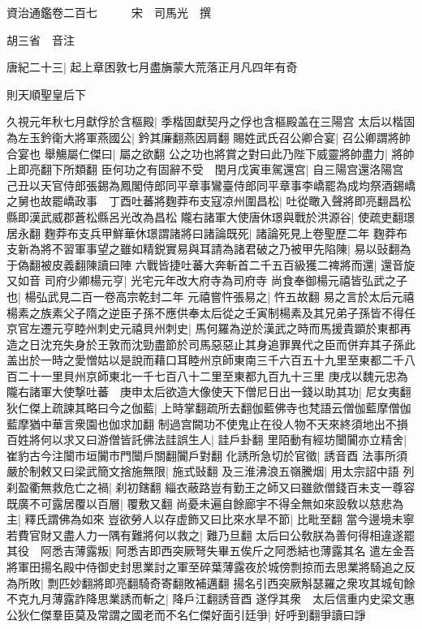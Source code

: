 資治通鑑卷二百七　　　宋　司馬光　撰

胡三省　音注

唐紀二十三|{
	起上章困敦七月盡㫋蒙大荒落正月凡四年有奇}


則天順聖皇后下

久視元年秋七月獻俘於含樞殿|{
	季楷固獻契丹之俘也含樞殿盖在三陽宫}
太后以楷固為左玉鈐衛大將軍燕國公|{
	鈐其廉翻燕因肩翻}
賜姓武氏召公卿合宴|{
	召公卿謂將帥合宴也}
舉觴屬仁傑曰|{
	屬之欲翻}
公之功也將賞之對曰此乃陛下威靈將帥盡力|{
	將帥上即亮翻下所類翻}
臣何功之有固辭不受　閏月戊寅車駕還宫|{
	自三陽宫還洛陽宫}
己丑以天官侍郎張錫為鳳閣侍郎同平章事鸞臺侍郎同平章事李嶠罷為成均祭酒錫嶠之舅也故罷嶠政事　丁酉吐蕃將麴莽布支寇凉州圍昌松|{
	吐從瞰入聲將即亮翻昌松縣即漢武威郡蒼松縣呂光改為昌松}
隴右諸軍大使唐休璟與戰於洪源谷|{
	使疏吏翻璟居永翻}
麴莽布支兵甲鮮華休璟謂諸將曰諸論既死|{
	諸論死見上卷聖歷二年}
麴莽布支新為將不習軍事望之雖如精鋭實易與耳請為諸君破之乃被甲先陷陳|{
	易以䜴翻為于偽翻被皮義翻陳讀曰陣}
六戰皆捷吐蕃大奔斬首二千五百級獲二禆將而還|{
	還音旋又如音}
司府少卿楊元亨|{
	光宅元年改大府寺為司府寺}
尚食奉御楊元禧皆弘武之子也|{
	楊弘武見二百一卷高宗乾封二年}
元禧嘗忤張易之|{
	忤五故翻}
易之言於太后元禧楊素之族素父子隋之逆臣子孫不應供奉太后從之壬寅制楊素及其兄弟子孫皆不得任京官左遷元亨睦州刺史元禧貝州刺史|{
	馬何羅為逆於漢武之時而馬援貴顕於東都再造之日沈充失身於王敦而沈勁盡節於司馬惡惡止其身追罪異代之臣而併弃其子孫此盖出於一時之愛憎姑以是說而藉口耳睦州京師東南三千六百五十九里至東都二千八百二十一里貝州京師東北一千七百八十二里至東都九百九十三里}
庚戌以魏元忠為隴右諸軍大使撃吐蕃　庚申太后欲造大像使天下僧尼日出一錢以助其功|{
	尼女夷翻}
狄仁傑上疏諫其略曰今之伽藍|{
	上時掌翻疏所去翻伽藍佛寺也梵語云僧伽藍摩僧伽藍摩猶中華言衆園也伽求加翻}
制過宫闕功不使鬼止在役人物不天來終須地出不損百姓將何以求又曰游僧皆託佛法詿誤生人|{
	詿戶卦翻}
里陌動有經坊闤闠亦立精舍|{
	崔豹古今注闤市垣闠市門闤戶關翻闠戶對翻}
化誘所急切於官徵|{
	誘音酉}
法事所須嚴於制敕又曰梁武簡文捨施無限|{
	施式䜴翻}
及三淮沸浪五嶺騰烟|{
	用太宗詔中語}
列刹盈衢無救危亡之禍|{
	刹初鎋翻}
緇衣蔽路豈有勤王之師又曰雖歛僧錢百未支一尊容既廣不可露居覆以百層|{
	覆敷又翻}
尚憂未遍自餘廊宇不得全無如來設敎以慈悲為主|{
	釋氏謂佛為如來}
豈欲勞人以存虚飾又曰比來水旱不節|{
	比毗至翻}
當今邊境未寧若費官財又盡人力一隅有難將何以救之|{
	難乃旦翻}
太后曰公敎朕為善何得相違遂罷其役　阿悉吉薄露叛|{
	阿悉吉即西突厥弩失畢五俟斤之阿悉結也薄露其名}
遣左金吾將軍田揚名殿中侍御史封思業討之軍至碎葉薄露夜於城傍剽掠而去思業將騎追之反為所敗|{
	剽匹妙翻將即亮翻騎奇寄翻敗補邁翻}
揚名引西突厥斛瑟羅之衆攻其城旬餘不克九月薄露詐降思業誘而斬之|{
	降戶江翻誘音酉}
遂俘其衆　太后信重内史梁文惠公狄仁傑羣臣莫及常謂之國老而不名仁傑好面引廷爭|{
	好呼到翻爭讀曰諍}
